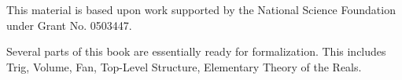 \noindent

\bigskip\noindent
This material is based upon work supported by the National Science
Foundation under
Grant No. 0503447.

\bigskip\noindent
Several parts of this book are essentially ready
for formalization.  This includes Trig, Volume, Fan, Top-Level Structure, Elementary Theory of the Reals.

\bigskip\noindent\svninfo 


\smallskip
\newpage

